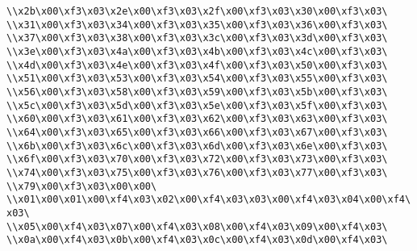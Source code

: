 \verb|\\x2b\x00\xf3\x03\x2e\x00\xf3\x03\x2f\x00\xf3\x03\x30\x00\xf3\x03\|\newline
\verb|\\x31\x00\xf3\x03\x34\x00\xf3\x03\x35\x00\xf3\x03\x36\x00\xf3\x03\|\newline
\verb|\\x37\x00\xf3\x03\x38\x00\xf3\x03\x3c\x00\xf3\x03\x3d\x00\xf3\x03\|\newline
\verb|\\x3e\x00\xf3\x03\x4a\x00\xf3\x03\x4b\x00\xf3\x03\x4c\x00\xf3\x03\|\newline
\verb|\\x4d\x00\xf3\x03\x4e\x00\xf3\x03\x4f\x00\xf3\x03\x50\x00\xf3\x03\|\newline
\verb|\\x51\x00\xf3\x03\x53\x00\xf3\x03\x54\x00\xf3\x03\x55\x00\xf3\x03\|\newline
\verb|\\x56\x00\xf3\x03\x58\x00\xf3\x03\x59\x00\xf3\x03\x5b\x00\xf3\x03\|\newline
\verb|\\x5c\x00\xf3\x03\x5d\x00\xf3\x03\x5e\x00\xf3\x03\x5f\x00\xf3\x03\|\newline
\verb|\\x60\x00\xf3\x03\x61\x00\xf3\x03\x62\x00\xf3\x03\x63\x00\xf3\x03\|\newline
\verb|\\x64\x00\xf3\x03\x65\x00\xf3\x03\x66\x00\xf3\x03\x67\x00\xf3\x03\|\newline
\verb|\\x6b\x00\xf3\x03\x6c\x00\xf3\x03\x6d\x00\xf3\x03\x6e\x00\xf3\x03\|\newline
\verb|\\x6f\x00\xf3\x03\x70\x00\xf3\x03\x72\x00\xf3\x03\x73\x00\xf3\x03\|\newline
\verb|\\x74\x00\xf3\x03\x75\x00\xf3\x03\x76\x00\xf3\x03\x77\x00\xf3\x03\|\newline
\verb|\\x79\x00\xf3\x03\x00\x00\|\newline
\verb|\\x01\x00\x01\x00\xf4\x03\x02\x00\xf4\x03\x03\x00\xf4\x03\x04\x00\xf4\x03\|\newline
\verb|\\x05\x00\xf4\x03\x07\x00\xf4\x03\x08\x00\xf4\x03\x09\x00\xf4\x03\|\newline
\verb|\\x0a\x00\xf4\x03\x0b\x00\xf4\x03\x0c\x00\xf4\x03\x0d\x00\xf4\x03\|\newline
